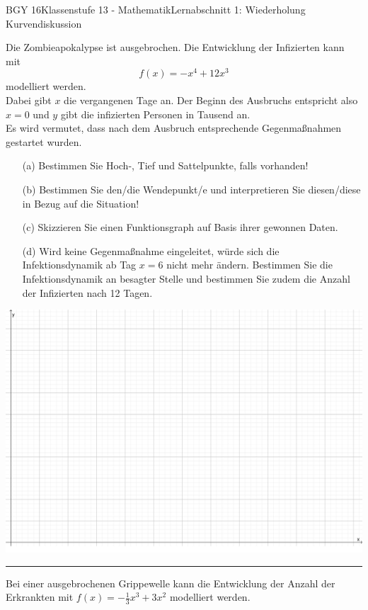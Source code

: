 \documentclass[oneside,openany,headings=optiontotoc,11pt,numbers=noenddot]{scrreprt}
\begin{document}
\begin{worksheet}{BGY 16}{Klassenstufe 13 - Mathematik}{Lernabschnitt 1: Wiederholung Kurvendiskussion}
\begin{framed}
			\noindent
			Die Zombieapokalypse ist ausgebrochen. Die Entwicklung der Infizierten kann mit \[f(x) = -x^4 + 12x^3\] modelliert werden.\\
			Dabei gibt \(x\) die vergangenen Tage an. Der Beginn des Ausbruchs entspricht also \(x = 0\) und \(y\) gibt die infizierten Personen in Tausend an.\\
			Es wird vermutet, dass nach dem Ausbruch entsprechende Gegenmaßnahmen gestartet wurden.
		\end{framed}
		\begin{itemize}
			\item[(a)] Bestimmen Sie Hoch-, Tief und Sattelpunkte, falls vorhanden!
			\item[(b)] Bestimmen Sie den/die Wendepunkt/e und interpretieren Sie diesen/diese in Bezug auf die Situation!
			\item[(c)] Skizzieren Sie einen Funktionsgraph auf Basis ihrer gewonnen Daten.
			\item[(d)] Wird keine Gegenmaßnahme eingeleitet, würde sich die Infektionsdynamik ab Tag \(x = 6\) nicht mehr ändern. Bestimmen Sie die Infektionsdynamik an besagter Stelle und bestimmen Sie zudem die Anzahl der Infizierten nach 12 Tagen.
		\end{itemize}
		\begin{center}
			\includegraphics[width=\textwidth]{../99_Bilder/00_Wdh/KoordLeer1.png}
		\end{center}
		\hrule
		\par\bigskip\noindent
		\begin{framed}
			\noindent
			Bei einer ausgebrochenen Grippewelle kann die Entwicklung der Anzahl der Erkrankten mit \(f(x) = -\frac{1}{3}x^3 + 3x^2\) modelliert werden.\\

\end{framed}
\end{worksheet}
\end{document}
